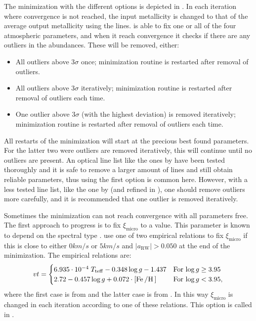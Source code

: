 The minimization with the different options is depicted in . In each
iteration where convergence is not reached, the input metallicity is changed to that of the average
output metallicity using the  lines.  is able to fix one or all of the four
atmospheric parameters, and when it reach convergence it checks if there are any outliers in the
abundances. These will be removed, either:
\begin{itemize}
  \item All outliers above $3\sigma$ once; minimization routine is restarted after removal of
        outliers.
  \item All outliers above $3\sigma$ iteratively; minimization routine is restarted after removal of
        outliers each time.
  \item One outlier above $3\sigma$ (with the highest deviation) is removed iteratively;
        minimization routine is restarted after removal of outliers each time.
\end{itemize}

All restarts of the minimization will start at the precious best found parameters. For the latter
two were outliers are removed iteratively, this will continue until no outliers are present. An
optical line list like the ones by \citet{Sousa2008a,Tsantaki2013} have been tested thoroughly and
it is safe to remove a larger amount of lines and still obtain reliable parameters, thus using the
first option is common here. However, with a less tested line list, like the one by
\citet{Andreasen2016} (and refined in \citet{Andreasen2017b}), one should remove outliers more
carefully, and it is recommended that one outlier is removed iteratively.

Sometimes the minimization can not reach convergence with all parameters free. The first approach to
progress is to fix $\xi_\mathrm{micro}$ to a value. This parameter is known to depend on the
spectral type \citep[see e.g.][and references therein]{Tsantaki2013}.  use one of two
empirical relations to fix $\xi_\mathrm{micro}$ if this is close to either $0\si{km/s}$ or
$5\si{km/s}$ and $|a_\mathrm{RW}| > 0.050$ at the end of the minimization. The empirical relations
are:
\begin{align}
  vt =
  \begin{cases}
    6.935 \cdot 10^{-4}\; T_\mathrm{teff} - 0.348 \log g - 1.437     & \text{For $\log g \ge 3.95$} \\
    2.72 - 0.457 \log g + 0.072 \cdot [\ion{Fe}/\ion{H}]             & \text{For $\log g < 3.95$},
  \end{cases}
\end{align}
where the first case is from \citet{Tsantaki2013} and the latter case is from \citet{Adibekyan2015}.
In this way $\xi_\mathrm{micro}$ is changed in each iteration according to one of these relations.
This option is called  in .

